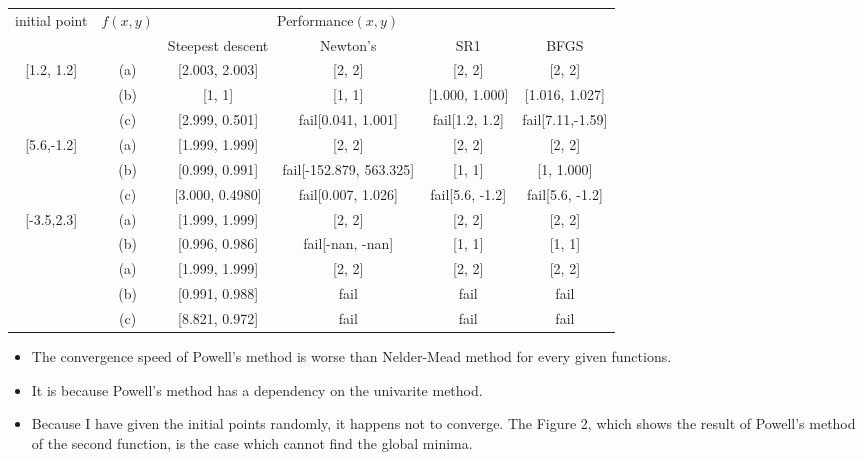 \documentclass[../main.tex]{subfiles}
\begin{document}
\begin{center}
  \begin{tabular}{| c | c | c | c | c | c | } \hline
  \multirow{2}{*}{initial point} & \multirow{2}{*}{$f(x, y)$}   & \multicolumn{3}{c|}{Performance$(x, y)$} \\ \cline{3-6}
  &                              & Steepest descent & Newton's & SR1 & BFGS \\ \hline
  \multirow{3}{*}{[1.2, 1.2]}     & (a)                          & [2.003, 2.003]   & [2, 2] & [2, 2] & [2, 2]  \\ 
                                  & (b)                          & [1, 1]           & [1, 1]& [1.000, 1.000] & [1.016, 1.027] \\ 
                                  & (c)                          & [2.999, 0.501]   & fail[0.041, 1.001] & fail[1.2, 1.2] & fail[7.11,-1.59]\\ \hline
  \multirow{3}{*}{[5.6,-1.2]}     & (a)                          & [1.999, 1.999]   & [2, 2] & [2, 2] & [2, 2] \\ 
                                  & (b)                          & [0.999, 0.991]   & fail[-152.879, 563.325] & [1, 1] & [1, 1.000] \\ 
                                  & (c)                          & [3.000, 0.4980]  & fail[0.007, 1.026] & fail[5.6, -1.2] & fail[5.6, -1.2] \\ \hline
  \multirow{3}{*}{[-3.5,2.3]}     & (a)                          & [1.999, 1.999]   & [2, 2] & [2, 2] & [2, 2] \\ 
                                  & (b)                          & [0.996, 0.986]   & fail[-nan, -nan] & [1, 1] & [1, 1] \\ 
  \multirow{3}{*}{[10.5,-8.3]}    & (a)                          & [1.999, 1.999]   & [2, 2] & [2, 2] & [2, 2] \\ 
                                  & (b)                          & [0.991, 0.988]   & fail & fail & fail \\ 
                                  & (c)                          & [8.821, 0.972]   & fail & fail & fail \\ \hline
  \end{tabular}
\end{center}
\begin{itemize}
    \item The convergence speed of Powell's method is worse than Nelder-Mead method for every given functions.
    \item It is because Powell's method has a dependency on the univarite method.
    \item Because I have given the initial points randomly, it happens not to converge. 
    The Figure 2, which shows the result of Powell's method of the second function, is the case which cannot find the global minima.
  \end{itemize}
\end{document}
